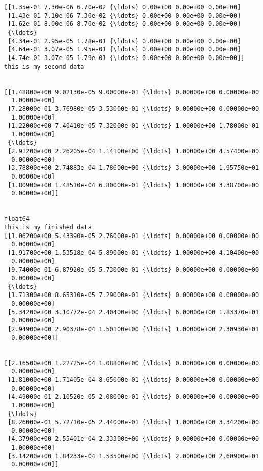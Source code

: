 \documentclass[11pt]{article}
\begin{document}
    \begin{Verbatim}[commandchars=\\\{\}]
[[1.35e-01 7.30e-06 6.70e-02 {\ldots} 0.00e+00 0.00e+00 0.00e+00]
 [1.43e-01 7.10e-06 7.30e-02 {\ldots} 0.00e+00 0.00e+00 0.00e+00]
 [1.62e-01 8.00e-06 8.70e-02 {\ldots} 0.00e+00 0.00e+00 0.00e+00]
 {\ldots}
 [4.34e-01 2.95e-05 1.78e-01 {\ldots} 0.00e+00 0.00e+00 0.00e+00]
 [4.64e-01 3.07e-05 1.95e-01 {\ldots} 0.00e+00 0.00e+00 0.00e+00]
 [4.74e-01 3.07e-05 1.79e-01 {\ldots} 0.00e+00 0.00e+00 0.00e+00]]
this is my second data


[[1.48800e+00 9.02130e-05 9.00000e-01 {\ldots} 0.00000e+00 0.00000e+00
  1.00000e+00]
 [7.28000e-01 3.76980e-05 3.53000e-01 {\ldots} 0.00000e+00 0.00000e+00
  1.00000e+00]
 [1.22000e+00 7.40410e-05 7.32000e-01 {\ldots} 1.00000e+00 1.78000e-01
  1.00000e+00]
 {\ldots}
 [2.91200e+00 2.26205e-04 1.14100e+00 {\ldots} 1.00000e+00 4.57400e+00
  0.00000e+00]
 [3.78800e+00 2.74883e-04 1.78600e+00 {\ldots} 3.00000e+00 1.95750e+01
  0.00000e+00]
 [1.80900e+00 1.48510e-04 6.80000e-01 {\ldots} 1.00000e+00 3.38700e+00
  0.00000e+00]]


float64
this is my finished data
[[1.06200e+00 5.43390e-05 2.76000e-01 {\ldots} 0.00000e+00 0.00000e+00
  0.00000e+00]
 [1.91700e+00 1.53518e-04 5.89000e-01 {\ldots} 1.00000e+00 4.10400e+00
  0.00000e+00]
 [9.74000e-01 6.87920e-05 5.73000e-01 {\ldots} 0.00000e+00 0.00000e+00
  0.00000e+00]
 {\ldots}
 [1.71300e+00 8.65310e-05 7.29000e-01 {\ldots} 0.00000e+00 0.00000e+00
  0.00000e+00]
 [5.34200e+00 3.10772e-04 2.40400e+00 {\ldots} 6.00000e+00 1.83370e+01
  0.00000e+00]
 [2.94900e+00 2.90378e-04 1.50100e+00 {\ldots} 1.00000e+00 2.30930e+01
  0.00000e+00]]


[[2.16500e+00 1.22725e-04 1.08800e+00 {\ldots} 0.00000e+00 0.00000e+00
  0.00000e+00]
 [1.81000e+00 1.71405e-04 8.65000e-01 {\ldots} 0.00000e+00 0.00000e+00
  0.00000e+00]
 [4.49000e-01 2.10520e-05 2.08000e-01 {\ldots} 0.00000e+00 0.00000e+00
  1.00000e+00]
 {\ldots}
 [8.26000e-01 5.72710e-05 2.44000e-01 {\ldots} 1.00000e+00 3.34200e+00
  0.00000e+00]
 [4.37900e+00 2.55401e-04 2.33300e+00 {\ldots} 0.00000e+00 0.00000e+00
  1.00000e+00]
 [3.14200e+00 1.84233e-04 1.53500e+00 {\ldots} 2.00000e+00 2.60900e+01
  0.00000e+00]]





\end{Verbatim}
\end{document}
